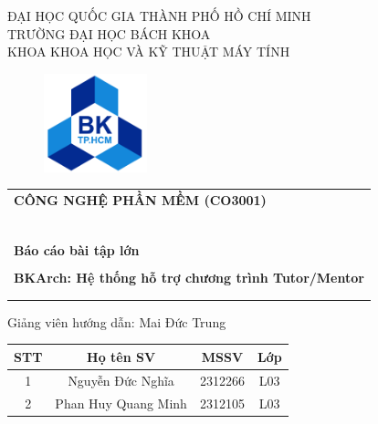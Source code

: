 \documentclass[a4paper, 15pt]{article}
\begin{document}
\begin{titlepage}
\begin{center}
ĐẠI HỌC QUỐC GIA THÀNH PHỐ HỒ CHÍ MINH \\
TRƯỜNG ĐẠI HỌC BÁCH KHOA \\
KHOA KHOA HỌC VÀ KỸ THUẬT MÁY TÍNH
\end{center}

\vspace{1cm}

\begin{figure}[h!]
\begin{center}
\includegraphics[width=3cm]{image/hcmut.png}
\end{center}
\end{figure}

\vspace{1cm}


\begin{center}
\begin{tabular}{c}

\multicolumn{1}{l}{\textbf{{\Large CÔNG NGHỆ PHẦN MỀM (CO3001)}}}\\
~~\\
\hline
\\
\multicolumn{1}{l}{\textbf{{\Large Báo cáo bài tập lớn}}}\\
\\

\textbf{{\Large BKArch: Hệ thống hỗ trợ chương trình Tutor/Mentor}}\\
\\

\\
\hline
\end{tabular}
\end{center}
\vspace{0.2cm}
\begin{center}
Giảng viên hướng dẫn:  Mai Đức Trung\\
\vspace{0.7cm}
\begin{tabular}{|c|c|c|c|}
\hline
\textbf{STT} & \textbf{Họ tên SV} & \textbf{MSSV} & \textbf{Lớp} \\
\hline 
{1} & {Nguyễn Đức Nghĩa}& {2312266} & {L03}\\
\hline 
{2} & {Phan Huy Quang Minh} & {2312105} & {L03}\\


\end{tabular}
\end{center}
\end{titlepage}
\end{document}
